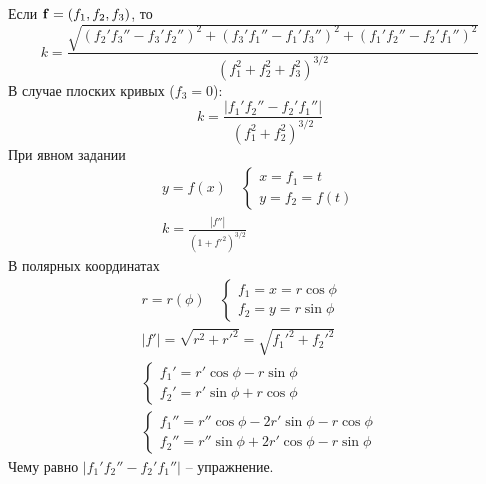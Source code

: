 \documentclass[main]{subfiles}
\begin{document}
Если $\mathbf{f} = (f_1, f_2, f_3)$, то
\[k = \frac{\sqrt{(f_2'f_3'' - f_3' f_2'')^2 + (f_3'f_1'' - f_1' f_3'')^2 + (f_1'f_2'' - f_2' f_1'')^2}}{(f_1^2 + f_2^2 + f_3^2)^{3/2}}\]
В случае плоских кривых ($f_3 = 0$):
\[k = \frac{|f_1'f_2'' - f_2' f_1''|}{(f_1^2 + f_2^2)^{3/2}}\]
При явном задании
\begin{gather*}
    y = f(x) \quad \begin{cases}
        x = f_1 = t \\
        y = f_2 = f(t)
    \end{cases}\\
    k = \frac{|f''|}{(1+ f'^2)^{3/2}}
\end{gather*}
В полярных координатах
\begin{gather*}
    r = r(\phi) \quad \begin{cases}
        f_1 = x = r \cos \phi \\
        f_2 = y = r \sin \phi
    \end{cases}\\
    |f'| = \sqrt{r^2 + r'^2} = \sqrt{f_1'^2 + f_2'^2}\\
    \begin{cases}
        f_1' = r' \cos \phi - r \sin \phi \\
        f_2' = r' \sin \phi + r \cos \phi
    \end{cases}\\
    \begin{cases}
        f_1'' = r'' \cos \phi - 2 r' \sin \phi - r \cos \phi \\
        f_2'' = r'' \sin \phi + 2 r' \cos \phi - r \sin \phi
    \end{cases}
\end{gather*}
Чему равно $|f_1'f_2'' - f_2' f_1''|$ -- упражнение.
\end{document}
